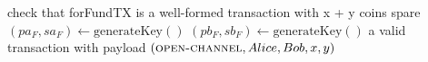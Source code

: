 \begin{algorithm}
  \caption{$\textsc{Funding}\left(Alice, Bob, x, y, \mathrm{AliceDelay},
  \mathrm{BobDelay}, \mathrm{forFundTX}\right)$}
  \label{alg:payfunc}
  \begin{algorithmic}[1]
    \State check that forFundTX is a well-formed transaction with x + y coins
    spare
    \State $\left(pa_F, sa_F\right) \gets \mathrm{generateKey}\left(\right)$
    \State $\left(pb_F, sb_F\right) \gets \mathrm{generateKey}\left(\right)$
    \State {}
    \State \Return a valid transaction with payload
    $\left(\textsc{open-channel}, Alice, Bob, x, y\right)$
  \end{algorithmic}
\end{algorithm}
